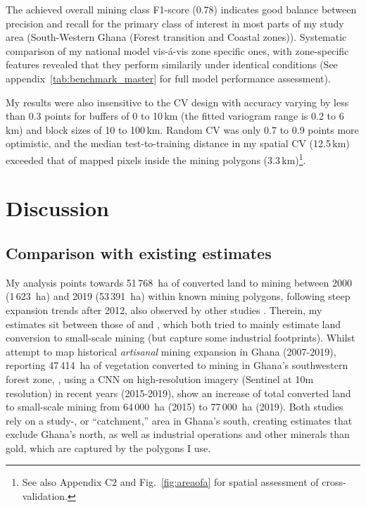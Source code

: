 \documentclass[]{interact}
\begin{document}
The achieved overall mining class F1-score (0.78) indicates good balance between precision and recall for the primary class of interest in most parts of my study area (South-Western Ghana (Forest transition and Coastal zones)). Systematic comparison of my national model vis-á-vis zone specific ones, with zone-specific features revealed that they perform similarily under identical conditions (See appendix~\ref{tab:benchmark_master} for full model performance assessment).

My results were also insensitive to the CV design with accuracy varying by less than 0.3 points for buffers of 0 to 10\,km (the fitted variogram range is 0.2 to 6\,km) and block sizes of 10 to 100\,km. Random CV was only 0.7 to 0.9 points more optimistic, and the median test-to-training distance in my spatial CV (12.5\,km) exceeded that of mapped pixels inside the mining polygons (3.3\,km)\footnote{See also Appendix C2 and Fig.~\ref{fig:areaofa} for spatial assessment of cross-validation.}.

\section{Discussion}
\subsection{Comparison with existing estimates}
My analysis points towards 51\,768~ha of converted land to mining between 2000 (1\,623~ha) and 2019 (53\,391~ha) within known mining polygons, following steep expansion trends after 2012, also observed by other studies \citep{snapir2017Mapping,barenblitt2021large,gallwey2020Sentinel2,obodai2019Land,forkuor2020Mapping}. Therein, my estimates sit between those of \citet{barenblitt2021large} and \citet{gallwey2020Sentinel2}, which both tried to mainly estimate land conversion to small-scale mining (but capture some industrial footprints). Whilst \citet{barenblitt2021large} attempt to map historical \textit{artisanal} mining expansion in Ghana (2007-2019), reporting 47\,414~ha of vegetation converted to mining in Ghana's southwestern forest zone, \citet[p.10]{gallwey2020Sentinel2}, using a CNN on high-resolution imagery (Sentinel at 10m resolution) in recent years (2015-2019), show an increase of total converted land to small-scale mining from 64\,000~ha (2015) to 77\,000~ha (2019). Both studies rely on a study-, or ``catchment,'' area in Ghana's south, creating estimates that exclude Ghana's north, as well as industrial operations and other minerals than gold, which are captured by the \citet{maus2022update} polygons I use. 
\end{document}
